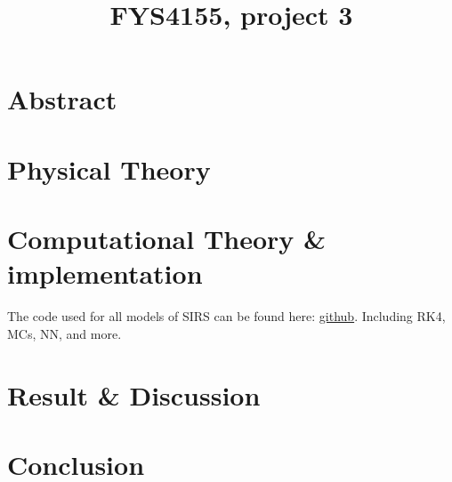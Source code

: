 
\usepackage{babel, csquotes, newcent, textcomp}
\usepackage[backend=biber, sortcites]{biblatex}


\title{FYS4155, project 3 }

	\mnfrontpage

\section{Abstract}

	
\pagestyle{fancy}
\fancyhf{}
\fancyfoot[CE,LO]{\leftmark}

\renewcommand{\headrulewidth}{2pt}
\renewcommand{\footrulewidth}{1pt}


	\tableofcontents



\pagebreak


\pagebreak
\section{Physical Theory}


\pagebreak
\section{Computational Theory \& implementation}\label{sec:comp-theory}
The code used for all models of SIRS can be found here: \href{https://github.com/sondrt/FYS-STK4155/tree/master/Project3}{github}. Including RK4, MCs, NN, and more.



%

\section{Result \& Discussion}


\section{Conclusion}



\pagebreak
